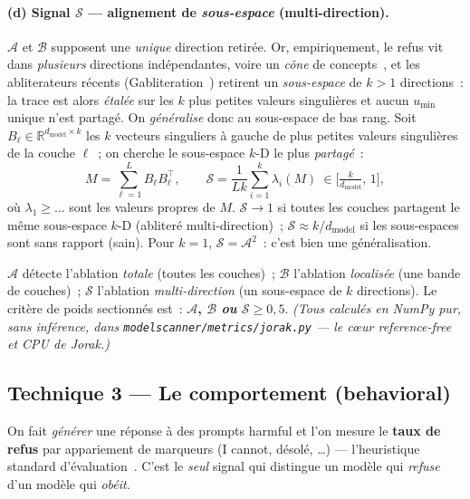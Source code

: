 \documentclass[11pt,a4paper]{article}
\theoremstyle{definition}
\theoremstyle{plain}
\newcommand{\R}{\mathbb{R}}
\newcommand{\dmodel}{d_{\text{model}}}
\begin{document}
\paragraph{(d) Signal $\mathcal{S}$ — alignement de \emph{sous-espace} (multi-direction).}
$\mathcal{A}$ et $\mathcal{B}$ supposent une \emph{unique} direction retirée. Or,
empiriquement, le refus vit dans \emph{plusieurs} directions indépendantes, voire un
\emph{cône} de concepts~\cite{wollschlager2025,piras2025}, et les abliterateurs
récents (Gabliteration~\cite{gabliteration}) retirent un
\emph{sous-espace} de $k>1$ directions~: la trace est alors \emph{étalée} sur les $k$
plus petites valeurs singulières et aucun $u_{\min}$ unique n'est partagé. On
\emph{généralise} donc au sous-espace de bas rang. Soit $B_\ell\in\R^{\dmodel\times k}$
les $k$ vecteurs singuliers à gauche de plus petites valeurs singulières de la couche
$\ell$~; on cherche le sous-espace $k$-D le plus \emph{partagé}~:
\begin{equation}\label{eq:subspace}
  M=\sum_{\ell=1}^{L} B_\ell B_\ell^\top,\qquad
  \mathcal{S}=\frac{1}{Lk}\sum_{i=1}^{k}\lambda_i(M)\ \in\Big[\tfrac{k}{\dmodel},\,1\Big],
\end{equation}
où $\lambda_1\ge\dots$ sont les valeurs propres de $M$. $\mathcal{S}\to 1$ si toutes
les couches partagent le même sous-espace $k$-D (abliteré multi-direction)~;
$\mathcal{S}\approx k/\dmodel$ si les sous-espaces sont sans rapport (sain). Pour
$k=1$, $\mathcal{S}=\mathcal{A}^2$~: c'est bien une généralisation.

\begin{intuition}
$\mathcal{A}$ détecte l'ablation \emph{totale} (toutes les couches)~; $\mathcal{B}$
l'ablation \emph{localisée} (une bande de couches)~; $\mathcal{S}$ l'ablation
\emph{multi-direction} (un sous-espace de $k$ directions). Le critère de
\og poids sectionnés\fg{} est~: \textbf{$\mathcal{A}$, $\mathcal{B}$ \emph{ou}
$\mathcal{S}\ge 0{,}5$}. \emph{(Tous calculés en NumPy pur, sans inférence, dans
\texttt{modelscanner/metrics/jorak.py} — le cœur \emph{reference-free} et CPU de Jorak.)}
\end{intuition}

\subsection{Technique 3 — Le comportement (behavioral)}\label{sec:behav}
On fait \emph{générer} une réponse à des prompts harmful et l'on mesure le
\textbf{taux de refus} par appariement de marqueurs (\og I cannot\fg{}, \og désolé\fg{},
\dots) — l'heuristique standard d'évaluation~\cite{zou2023}. C'est le \emph{seul}
signal qui distingue un modèle qui \emph{refuse} d'un modèle qui \emph{obéit}.
\end{document}
